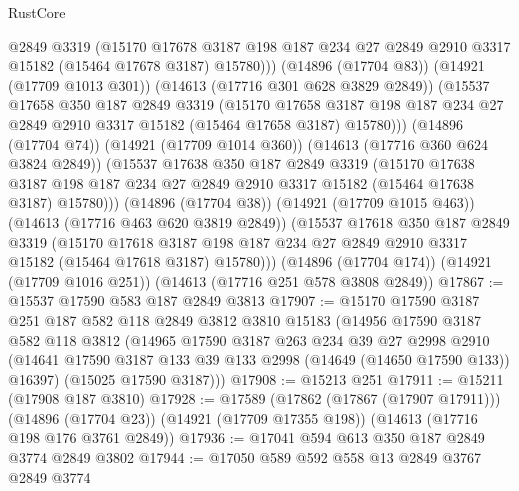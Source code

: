\begin{lexlean}{RustCore}
\begin{coremodule}
              @2849
              @3319
              (@15170
                @17678
                @3187
                @198
                @187
                @234
                @27
                @2849
                @2910
                @3317
                @15182
                (@15464 @17678 @3187)
                @15780)))
          (@14896 (@17704 @83))
          (@14921 (@17709 @1013 @301))
          (@14613 (@17716 @301 @628 @3829 @2849))
          (@15537
            @17658
            @350
            @187
            @2849
            @3319
            (@15170
              @17658
              @3187
              @198
              @187
              @234
              @27
              @2849
              @2910
              @3317
              @15182
              (@15464 @17658 @3187)
              @15780)))
        (@14896 (@17704 @74))
        (@14921 (@17709 @1014 @360))
        (@14613 (@17716 @360 @624 @3824 @2849))
        (@15537
          @17638
          @350
          @187
          @2849
          @3319
          (@15170
            @17638
            @3187
            @198
            @187
            @234
            @27
            @2849
            @2910
            @3317
            @15182
            (@15464 @17638 @3187)
            @15780)))
      (@14896 (@17704 @38))
      (@14921 (@17709 @1015 @463))
      (@14613 (@17716 @463 @620 @3819 @2849))
      (@15537
        @17618
        @350
        @187
        @2849
        @3319
        (@15170
          @17618
          @3187
          @198
          @187
          @234
          @27
          @2849
          @2910
          @3317
          @15182
          (@15464 @17618 @3187)
          @15780)))
    (@14896 (@17704 @174))
    (@14921 (@17709 @1016 @251))
    (@14613 (@17716 @251 @578 @3808 @2849))
@17867 := @15537 @17590 @583 @187 @2849 @3813
@17907 := @15170
    @17590
    @3187
    @251
    @187
    @582
    @118
    @2849
    @3812
    @3810
    @15183
    (@14956
      @17590
      @3187
      @582
      @118
      @3812
      (@14965
        @17590
        @3187
        @263
        @234
        @39
        @27
        @2998
        @2910
        (@14641 @17590 @3187 @133 @39 @133 @2998 (@14649 (@14650 @17590 @133)) @16397)
        (@15025 @17590 @3187)))
@17908 := @15213 @251
@17911 := @15211 (@17908 @187 @3810)
@17928 := @17589
    (@17862 (@17867 (@17907 @17911)))
    (@14896 (@17704 @23))
    (@14921 (@17709 @17355 @198))
    (@14613 (@17716 @198 @176 @3761 @2849))
@17936 := @17041 @594 @613 @350 @187 @2849 @3774 @2849 @3802
@17944 := @17050 @589 @592 @558 @13 @2849 @3767 @2849 @3774

\end{coremodule}
\end{lexlean}
